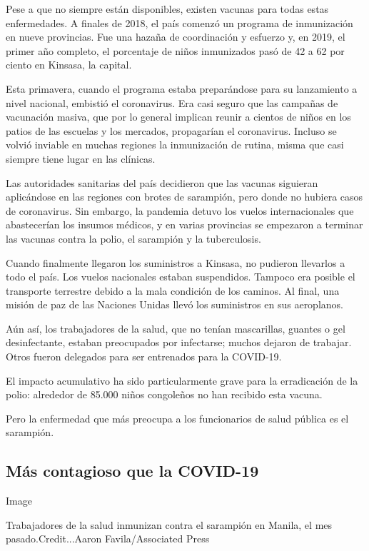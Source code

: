 Pese a que no siempre están disponibles, existen vacunas para todas
estas enfermedades. A finales de 2018, el país comenzó un programa de
inmunización en nueve provincias. Fue una hazaña de coordinación y
esfuerzo y, en 2019, el primer año completo, el porcentaje de niños
inmunizados pasó de 42 a 62 por ciento en Kinsasa, la capital.

Esta primavera, cuando el programa estaba preparándose para su
lanzamiento a nivel nacional, embistió el coronavirus. Era casi seguro
que las campañas de vacunación masiva, que por lo general implican
reunir a cientos de niños en los patios de las escuelas y los mercados,
propagarían el coronavirus. Incluso se volvió inviable en muchas
regiones la inmunización de rutina, misma que casi siempre tiene lugar
en las clínicas.

Las autoridades sanitarias del país decidieron que las vacunas siguieran
aplicándose en las regiones con brotes de sarampión, pero donde no
hubiera casos de coronavirus. Sin embargo, la pandemia detuvo los vuelos
internacionales que abastecerían los insumos médicos, y en varias
provincias se empezaron a terminar las vacunas contra la polio, el
sarampión y la tuberculosis.

Cuando finalmente llegaron los suministros a Kinsasa, no pudieron
llevarlos a todo el país. Los vuelos nacionales estaban suspendidos.
Tampoco era posible el transporte terrestre debido a la mala condición
de los caminos. Al final, una misión de paz de las Naciones Unidas llevó
los suministros en sus aeroplanos.

Aún así, los trabajadores de la salud, que no tenían mascarillas,
guantes o gel desinfectante, estaban preocupados por infectarse; muchos
dejaron de trabajar. Otros fueron delegados para ser entrenados para la
COVID-19.

El impacto acumulativo ha sido particularmente grave para la
erradicación de la polio: alrededor de 85.000 niños congoleños no han
recibido esta vacuna.

Pero la enfermedad que más preocupa a los funcionarios de salud pública
es el sarampión.

\hypertarget{muxe1s-contagioso-que-la-covid-19}{%
\subsection{Más contagioso que la
COVID-19}\label{muxe1s-contagioso-que-la-covid-19}}

Image

Trabajadores de la salud inmunizan contra el sarampión en Manila, el mes
pasado.Credit...Aaron Favila/Associated Press

